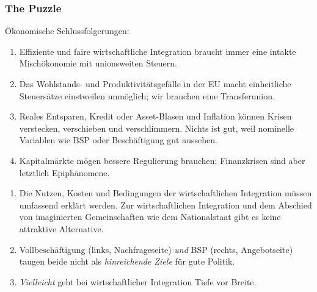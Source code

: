 \documentclass[]{beamer}
\begin{document}
\begin{frame}
\frametitle{The Puzzle}

Ökonomische Schlussfolgerungen:
\begin{enumerate}
	\item Effiziente und faire wirtschaftliche Integration braucht immer eine \alert{intakte Mischökonomie mit unionsweiten Steuern}.
	\item Das Wohlstands- und Produktivitätsgefälle in der EU macht einheitliche Steuersätze einstweilen unmöglich; wir brauchen eine \alert{Transferunion}.
	\item Reales Entsparen, Kredit oder Asset-Blasen und Inflation können Krisen verstecken, verschieben und verschlimmern. 
	\alert{Nichts ist gut, weil nominelle Variablen wie BSP oder Beschäftigung gut aussehen.}
	\item Kapitalmärkte mögen bessere Regulierung brauchen; \alert{Finanzkrisen sind aber letztlich Epiphänomene}.
\end{enumerate}

\begin{enumerate}
	\item Die Nutzen, Kosten und Bedingungen der wirtschaftlichen Integration müssen \alert{umfassend erklärt} werden.
	Zur wirtschaftlichen Integration und dem \alert{Abschied von imaginierten Gemeinschaften} wie dem Nationalstaat gibt es keine attraktive Alternative.
	\item Vollbeschäftigung (links, Nachfrageseite) \emph{und} BSP (rechts, Angebotseite) \alert{taugen beide nicht als \emph{hinreichende Ziele} für gute Politik}.
	\item \emph{Vielleicht} geht bei wirtschaftlicher Integration \alert{Tiefe vor Breite}.
\end{enumerate}

\end{frame}
\end{document}
